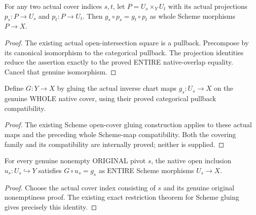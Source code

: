 \begin{lemma}
\label{lem:seven-original-native-inverse-pullback-route}
\leanok
{}
For any two actual cover indices $s,t$, let $P=U_s\times_Y U_t$ with its
actual projections $p_s:P\to U_s$ and $p_t:P\to U_t$. Then
$g_s\circ p_s=g_t\circ p_t$ as whole Scheme morphisms $P\to X$.
\end{lemma}
\begin{proof}
The existing actual open-intersection square is a pullback. Precompose by
its canonical isomorphism to the categorical pullback. The projection
identities reduce the assertion exactly to the proved ENTIRE native-overlap
equality. Cancel that genuine isomorphism.
\end{proof}

\begin{definition}
\label{def:seven-original-native-global-inverse-route}
\leanok
{}
Define $G:Y\to X$ by gluing the actual inverse chart maps $g_s:U_s\to X$
on the genuine WHOLE native cover, using their proved categorical
pullback compatibility.
\end{definition}
\begin{proof}
The existing Scheme open-cover gluing construction applies to these actual
maps and the preceding whole Scheme-map compatibility. Both the covering
family and its compatibility are internally proved; neither is supplied.
\end{proof}

\begin{theorem}
\label{thm:seven-original-native-global-inverse-local-route}
\leanok
{}
For every genuine nonempty ORIGINAL pivot $s$, the native open inclusion
$u_s:U_s\hookrightarrow Y$ satisfies $G\circ u_s=g_s$ as ENTIRE Scheme
morphisms $U_s\to X$.
\end{theorem}
\begin{proof}
Choose the actual cover index consisting of $s$ and its genuine original
nonemptiness proof. The existing exact restriction theorem for Scheme
gluing gives precisely this identity.
\end{proof}

